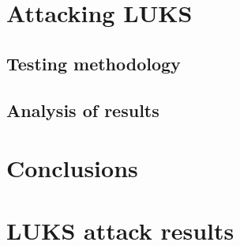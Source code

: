 \documentclass[nolof]{fithesis3}
\begin{document}
\chapter{Attacking LUKS}

\section{Testing methodology}


\section{Analysis of results}

\chapter{Conclusions}

\printbibliography

\appendix
\chapter{LUKS attack results}
\end{document}
